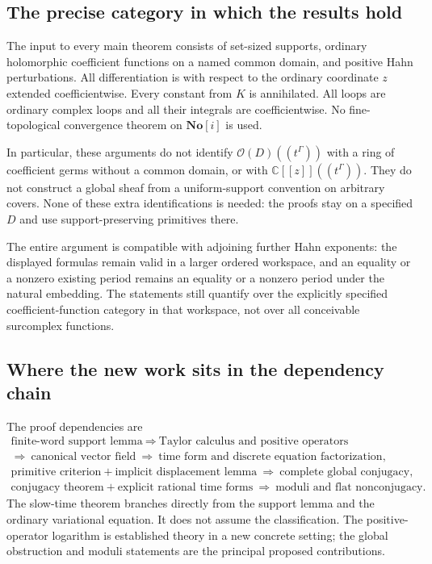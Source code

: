 \documentclass[11pt,a4paper]{article}
\numberwithin{equation}{section}
\theoremstyle{definition}
\theoremstyle{remark}
\newcommand{\C}{\mathbb C}
\newcommand{\No}{\mathbf{No}}
\newcommand{\Oh}{\mathcal O}
\begin{document}
\subsection{The precise category in which the results hold}

The input to every main theorem consists of set-sized supports, ordinary
holomorphic coefficient functions on a named common domain, and positive
Hahn perturbations.  All differentiation is with respect to the ordinary
coordinate $z$ extended coefficientwise.  Every constant from $K$ is
annihilated.  All loops are ordinary complex loops and all their integrals
are coefficientwise.  No fine-topological convergence theorem on
$\No[i]$ is used.

In particular, these arguments do not identify
$\Oh(D)((t^\Gamma))$ with a ring of coefficient germs without a common
domain, or with $\C[[z]]((t^\Gamma))$.  They do not construct a global
sheaf from a uniform-support convention on arbitrary covers.  None of
these extra identifications is needed: the proofs stay on a specified $D$
and use support-preserving primitives there.

The entire argument is compatible with adjoining further Hahn exponents:
the displayed formulas remain valid in a larger ordered workspace, and an
equality or a nonzero existing period remains an equality or a nonzero
period under the natural embedding.  The statements still quantify over
the explicitly specified coefficient-function category in that workspace,
not over all conceivable surcomplex functions.

\subsection{Where the new work sits in the dependency chain}

The proof dependencies are
\[
 \begin{gathered}
 \text{finite-word support lemma}
 \ \Longrightarrow\ \text{Taylor calculus and positive operators}
 \\
 \Longrightarrow\ \text{canonical vector field}\
 \Longrightarrow\ \text{time form and discrete equation factorization},
 \\
 \text{primitive criterion}+
 \text{implicit displacement lemma}
 \ \Longrightarrow\ \text{complete global conjugacy},
 \\
 \text{conjugacy theorem}+
 \text{explicit rational time forms}
 \ \Longrightarrow\ \text{moduli and flat nonconjugacy}.
 \end{gathered}
\]
The slow-time theorem branches directly from the support lemma and the
ordinary variational equation.  It does not assume the classification.
The positive-operator logarithm is established theory in a new concrete
setting; the global obstruction and moduli statements are the principal
proposed contributions.
\end{document}
